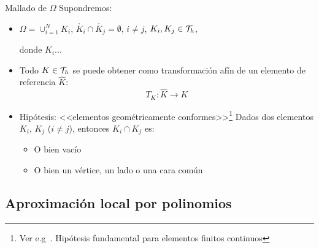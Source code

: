 \documentclass[9pt,leqno]{beamer}
\newcommand{\Nt}{N}
\newcommand{\interior}[1]{\mathring{#1}}
\newcommand{\refelem}{\widehat}
\begin{document}
\begin{frame}{Mallado de $\Omega$}
  Supondremos:
  \bigskip
  \begin{itemize}\itemsep1em
  \item  $\Omega=\cup_{i=1}^\Nt K_i$, \quad
    $\interior{K_i}\cap\interior{K_j}=\emptyset$, $i\neq j$,
    \quad $K_i,K_j\in{\cal T}_h$,
    \begin{flushright}
      \scriptsize
      donde $K_i$... 
    \end{flushright}
  \item Todo $K\in{\cal T}_h$ se puede obtener como transformación afín de un
    \alert{elemento de referencia} $\refelem K$:
    $$T_K: \refelem K \to K$$

  \item Hipótesis: <<\alert{elementos geométricamente conformes}>>\footnote{Ver e.g~\cite{Ern-Guermond:04}. Hipótesis fundamental para elementos finitos continuos}
    Dados dos elementos $K_i$, $K_j$ ($i\neq j$), entonces $K_i\cap K_j$ es:
    \begin{itemize}
    \item O bien vacío
    \item O bien un vértice, un lado o una cara común
    \end{itemize}
  \end{itemize}
\end{frame}


\subsection{Aproximación local por polinomios}
\end{document}
